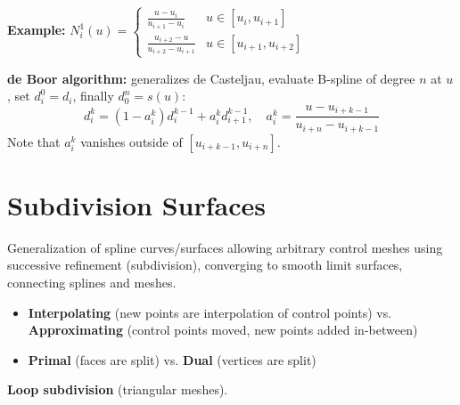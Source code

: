 \documentclass[a4paper,9pt]{article}
\begin{document}
\textbf{Example:} $N_i^1(u) = \begin{cases} \frac{u-u_i}{u_{i+1}-u_i} & u \in [u_i, u_{i+1}] \\ \frac{u_{i+2}-u}{u_{i+2}-u_{i+1}} & u \in [u_{i+1}, u_{i+2}] \end{cases}$

\textbf{de Boor algorithm:} generalizes de Casteljau, evaluate B-spline of degree $n$ at $u$, set $d_i^0 = d_i$, finally $d_0^n = s(u)$:
$$d_i^k = (1 - a_i^k) d_i^{k-1} + a_i^k d_{i+1}^{k-1},\quad a_i^k = \frac{u - u_{i+k-1}}{u_{i+n} - u_{i+k-1}}$$
Note that $a_i^k$ vanishes outside of $[u_{i+k-1}, u_{i+n}]$.

\section{Subdivision Surfaces}
Generalization of spline curves/surfaces allowing arbitrary control meshes using successive refinement (subdivision), converging to smooth limit surfaces, connecting splines and meshes.
\begin{itemize}
  \item \textbf{Interpolating} (new points are interpolation of control points) vs. \textbf{Approximating} (control points moved, new points added in-between)
  \item \textbf{Primal} (faces are split) vs. \textbf{Dual} (vertices are split)
\end{itemize}
\textbf{Loop subdivision} (triangular meshes).\
\end{document}
